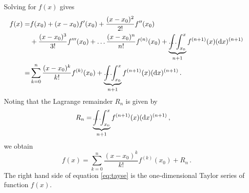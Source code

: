 Solving for $f(x)$ gives
\begin{align*}
  f(x) = &f(x_0)
           + (x - x_0) f'(x_0)
           + \frac{(x-x_0)^2}{2!} f''(x_0) \\
         &+ \frac{(x - x_0)^3}{3!} f'''(x_0)
           + \mathellipsis \frac{(x - x_0)^n}{n!} f^{(n)}(x_0)
           + \underbrace{\int \hspace{-4mm} \hdots \hspace{-1mm} \int_{x_0}^x}_{n+1}{f^{(n+1)}(x)(\dif x)^{(n+1)}} \\
  = &\sum_{k=0}^n{\frac{(x - x_0)^k}{k!}}f^{(k)}(x_0) + \underbrace{\int \hspace{-4mm} \hdots \hspace{-1mm} \int_{x_0}^x}_{n+1}{f^{(n+1)}(x)(\dif x)^{(n+1)}} \, .
\end{align*}
Noting that the Lagrange remainder $R_n$ is given by
\begin{align*}
  R_n = &\underbrace{\int \hspace{-4mm} \hdots \hspace{-1mm} \int_{x_0}^x}_{n+1}{f^{(n+1)}(x)(\dif x)^{(n+1)}} \, ,
\end{align*}
we obtain
\begin{equation}
  \label{eq:tayse}
  f(x) = \sum_{k=0}^n{\frac{(x - x_0)^k}{k!}}f^{(k)}(x_0) + R_n \, .
\end{equation}
The right hand side of equation \eqref{eq:tayse} is the one-dimensional Taylor series of function $f(x)$.

